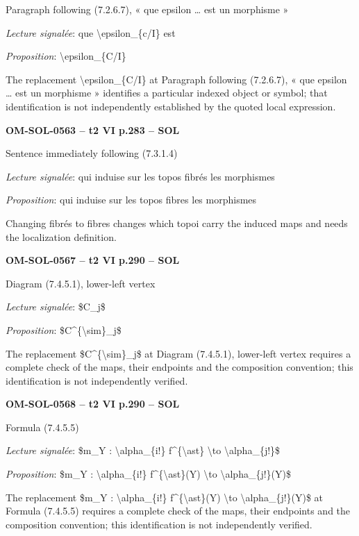 Paragraph following (7.2.6.7), « que epsilon … est un morphisme »\par
\emph{Lecture signalée}: que \textbackslash{}epsilon\_\{c/I\} est\par
\emph{Proposition}: \textbackslash{}epsilon\_\{C/I\}\par
The replacement \textbackslash{}epsilon\_\{C/I\} at Paragraph following (7.2.6.7), « que epsilon … est un morphisme » identifies a particular indexed object or symbol; that identification is not independently established by the quoted local expression.\par
\par\noindent\textbf{OM-SOL-0563 -- t2 VI p.283 -- SOL}\par
Sentence immediately following (7.3.1.4)\par
\emph{Lecture signalée}: qui induise sur les topos fibrés les morphismes\par
\emph{Proposition}: qui induise sur les topos fibres les morphismes\par
Changing fibrés to fibres changes which topoi carry the induced maps and needs the localization definition.\par
\par\noindent\textbf{OM-SOL-0567 -- t2 VI p.290 -- SOL}\par
Diagram (7.4.5.1), lower-left vertex\par
\emph{Lecture signalée}: \$C\_j\$\par
\emph{Proposition}: \$C\textasciicircum{}\{\textbackslash{}sim\}\_j\$\par
The replacement \$C\textasciicircum{}\{\textbackslash{}sim\}\_j\$ at Diagram (7.4.5.1), lower-left vertex requires a complete check of the maps, their endpoints and the composition convention; this identification is not independently verified.\par
\par\noindent\textbf{OM-SOL-0568 -- t2 VI p.290 -- SOL}\par
Formula (7.4.5.5)\par
\emph{Lecture signalée}: \$m\_Y : \textbackslash{}alpha\_\{i!\} f\textasciicircum{}\{\textbackslash{}ast\} \textbackslash{}to \textbackslash{}alpha\_\{j!\}\$\par
\emph{Proposition}: \$m\_Y : \textbackslash{}alpha\_\{i!\} f\textasciicircum{}\{\textbackslash{}ast\}(Y) \textbackslash{}to \textbackslash{}alpha\_\{j!\}(Y)\$\par
The replacement \$m\_Y : \textbackslash{}alpha\_\{i!\} f\textasciicircum{}\{\textbackslash{}ast\}(Y) \textbackslash{}to \textbackslash{}alpha\_\{j!\}(Y)\$ at Formula (7.4.5.5) requires a complete check of the maps, their endpoints and the composition convention; this identification is not independently verified.\par
